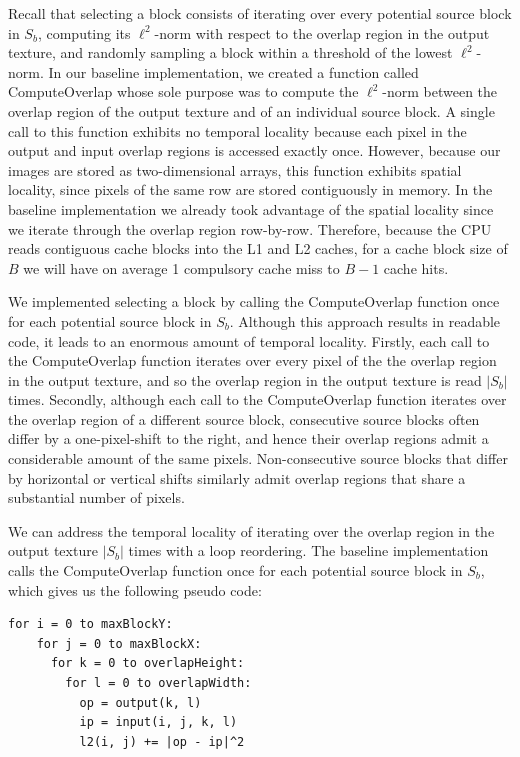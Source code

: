 \documentclass[letterpaper]{article}
\newcommand{\inline}[1]{{\ttfamily\hyphenchar\font=45 #1}}
\begin{document}
Recall that selecting a block consists of iterating over every potential source block in $S_b$, computing its $\ell ^2$-norm with respect to the overlap region in the output texture, and randomly sampling a block within a threshold of the lowest $\ell ^2$-norm. In our baseline implementation, we created a function called \inline{ComputeOverlap} whose sole purpose was to compute the $\ell ^2$-norm between the overlap region of the output texture and of an individual source block. A single call to this function exhibits no temporal locality because each pixel in the output and input overlap regions is accessed exactly once. However, because our images are stored as two-dimensional arrays, this function exhibits spatial locality, since pixels of the same row are stored contiguously in memory. In the baseline implementation we already took advantage of the spatial locality since we iterate through the overlap region row-by-row. Therefore, because the CPU reads contiguous cache blocks into the L1 and L2 caches, for a cache block size of $B$ we will have on average 1 compulsory cache miss to $B-1$ cache hits.

We implemented selecting a block by calling the \inline{ComputeOverlap} function once for each potential source block in $S_b$. Although this approach results in readable code, it leads to an enormous amount of temporal locality. Firstly, each call to the \inline{ComputeOverlap} function iterates over every pixel of the the overlap region in the output texture, and so the overlap region in the output texture is read $|S_b|$ times. Secondly, although each call to the \inline{ComputeOverlap} function iterates over the overlap region of a different source block, consecutive source blocks often differ by a one-pixel-shift to the right, and hence their overlap regions admit a considerable amount of the same pixels. Non-consecutive source blocks that differ by horizontal or vertical shifts similarly admit overlap regions that share a substantial number of pixels.

We can address the temporal locality of iterating over the overlap region in the output texture $|S_b|$ times with a loop reordering. The baseline implementation calls the \inline{ComputeOverlap} function once for each potential source block in $S_b$, which gives us the following pseudo code:

\begin{lstlisting}[style=cppstyle]
  for i = 0 to maxBlockY:
    for j = 0 to maxBlockX:
      for k = 0 to overlapHeight:
        for l = 0 to overlapWidth:
          op = output(k, l)
          ip = input(i, j, k, l)
          l2(i, j) += |op - ip|^2
\end{lstlisting}
\end{document}
